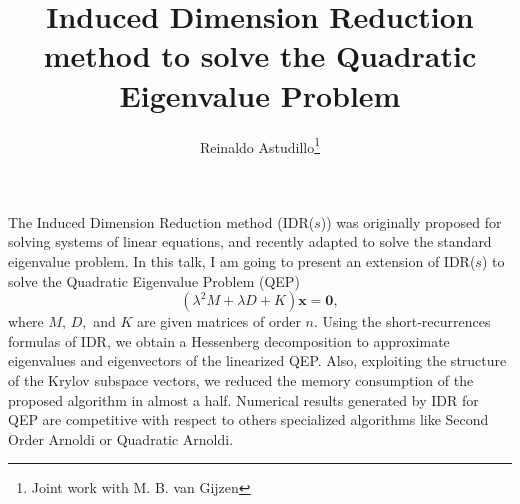 \documentclass{article}
\title{Induced Dimension Reduction method to solve the Quadratic Eigenvalue Problem}
\author{Reinaldo Astudillo\thanks{Joint work with M. B. van Gijzen}}
\affil{PhD student at TU Delft, The Netherlands}
\date{ }
\newcommand{\vv}[1]{\mathbf{#1}}
\begin{document}
\maketitle
\setcounter{page}{13}
    The Induced Dimension Reduction method (IDR($s$)) was
    originally proposed for solving systems of linear equations, and recently adapted 
    to solve the standard eigenvalue problem. In this talk,  I am going to present an extension of IDR($s$) to solve the Quadratic Eigenvalue Problem (QEP) 
    $$(\lambda^2 M + \lambda D + K)\vv{x} = \vv{0},$$
    where $M,\, D,$ and $K$ are given matrices of order $n$. Using the short-recurrences formulas of IDR, we obtain a Hessenberg decomposition to approximate eigenvalues and eigenvectors 
    of the linearized QEP. Also, exploiting the structure of the Krylov subspace vectors, we reduced the memory consumption of the proposed algorithm in almost a half.
    Numerical results generated by IDR for QEP  are competitive with respect to others specialized algorithms  
    like Second Order Arnoldi or Quadratic Arnoldi.
\end{document}
